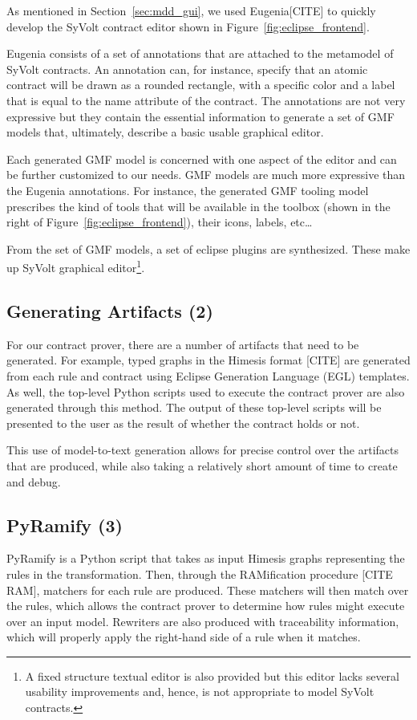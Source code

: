 As mentioned in Section~\ref{sec:mdd_gui}, we used Eugenia[CITE] to quickly develop the SyVolt contract editor shown in Figure~\ref{fig:eclipse_frontend}.

Eugenia consists of a set of annotations that are attached to the metamodel of
SyVolt contracts. An annotation can, for instance, specify that an atomic contract will be drawn as a rounded rectangle, with a specific color and a label that is equal to the name attribute of the contract.
The annotations are not very expressive but they contain the essential information to generate a set of GMF models that, ultimately, describe a basic usable graphical editor. 

Each generated GMF model is concerned with one aspect of the editor and can be further customized to our needs. GMF models are much more expressive than the Eugenia annotations.
For instance, the generated GMF tooling model prescribes the kind of tools that
will be available in the toolbox (shown in the right of
Figure~\ref{fig:eclipse_frontend}), their icons, labels, etc\ldots

From the set of GMF models, a set of eclipse plugins are synthesized.
These make up SyVolt graphical editor\footnote{A fixed structure textual editor is also provided but this editor lacks several usability improvements and, hence, is not appropriate to model SyVolt contracts.}.


\subsection{Generating Artifacts (2)}
For our contract prover, there are a number of artifacts that need to be generated. For example, typed graphs in the Himesis format [CITE] are generated from each rule and contract using Eclipse Generation Language (EGL) templates. As well, the top-level Python scripts used to execute the contract prover are also generated through this method. The output of these top-level scripts will be presented to the user as the result of whether the contract holds or not.

This use of model-to-text generation allows for precise control over the artifacts that are produced, while also taking a relatively short amount of time to create and debug.

\subsection{PyRamify (3)}

PyRamify is a Python script that takes as input Himesis graphs representing the rules in the transformation. Then, through the RAMification procedure [CITE RAM], matchers for each rule are produced. These matchers will then match over the rules, which allows the contract prover to determine how rules might execute over an input model. Rewriters are also produced with traceability information, which will properly apply the right-hand side of a rule when it matches.

